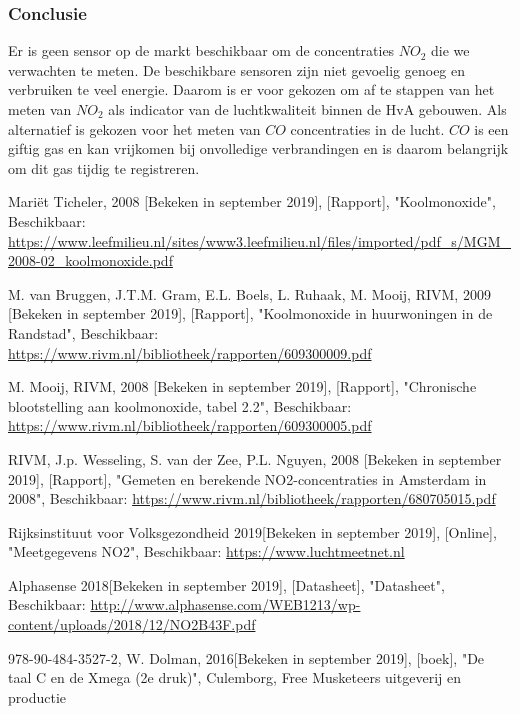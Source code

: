 \documentclass[a4paper, 11pt]{article} %
\begin{document}
\subsubsection{Conclusie}
Er is geen sensor op de markt beschikbaar om de concentraties $NO_2$ die we verwachten te meten. De beschikbare sensoren zijn niet gevoelig genoeg en verbruiken te veel energie. Daarom is er voor gekozen om af te stappen van het meten van $NO_2$ als indicator van de luchtkwaliteit binnen de HvA gebouwen. Als alternatief is gekozen voor het meten van $CO$ concentraties in de lucht. $CO$ is een giftig gas en kan vrijkomen bij onvolledige verbrandingen en is daarom belangrijk om dit gas tijdig te registreren.
\newpage
\begin{thebibliography}{9}
	Mariët Ticheler, 
	2008 [Bekeken in september 2019],
	[Rapport],
	"Koolmonoxide",
	Beschikbaar: \url{https://www.leefmilieu.nl/sites/www3.leefmilieu.nl/files/imported/pdf_s/MGM_2008-02_koolmonoxide.pdf}
	
	M. van Bruggen, J.T.M. Gram, E.L. Boels, L. Ruhaak, M. Mooij,
	RIVM,
	2009 [Bekeken in september 2019],
	[Rapport],
	"Koolmonoxide in huurwoningen in de Randstad",
	Beschikbaar: \url{https://www.rivm.nl/bibliotheek/rapporten/609300009.pdf}
	
	M. Mooij,
	RIVM,
	2008 [Bekeken in september 2019],
	[Rapport],
	"Chronische blootstelling aan koolmonoxide, tabel 2.2",
	Beschikbaar: \url{https://www.rivm.nl/bibliotheek/rapporten/609300005.pdf}
	
	RIVM, J.p. Wesseling, S. van der Zee, P.L. Nguyen,
	2008 [Bekeken in september 2019],
	[Rapport],
	"Gemeten en berekende NO2-concentraties in Amsterdam in 2008",
	Beschikbaar: \url{https://www.rivm.nl/bibliotheek/rapporten/680705015.pdf}
	
	Rijksinstituut voor Volksgezondheid
	2019[Bekeken in september 2019],
	[Online],
	"Meetgegevens NO2",
	Beschikbaar: \url{https://www.luchtmeetnet.nl}
	
	Alphasense
	2018[Bekeken in september 2019],
	[Datasheet],
	"Datasheet",
	Beschikbaar: \url{http://www.alphasense.com/WEB1213/wp-content/uploads/2018/12/NO2B43F.pdf}
	
	978-90-484-3527-2,
	W. Dolman,
	2016[Bekeken in september 2019],
	[boek],
	"De taal C en de Xmega (2e druk)",
	Culemborg,
	Free Musketeers uitgeverij en productie
\end{thebibliography}
\end{document}
